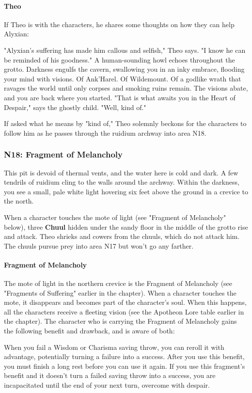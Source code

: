 \documentclass[10pt,a4,twoside,twocolumn,openany,nodeprecatedcode]{dndbook}
\begin{document}
\paragraph{Theo}
If Theo is with the characters, he shares some thoughts on how they can help Alyxian:
\begin{DndReadAloud}{}
"Alyxian's suffering has made him callous and selfish," Theo says. "I know he can be reminded of his goodness."
A human-sounding howl echoes throughout the grotto. Darkness engulfs the cavern, swallowing you in an inky embrace, flooding your mind with visions. Of Ank'Harel. Of Wildemount. Of a godlike wrath that ravages the world until only corpses and smoking ruins remain. The visions abate, and you are back where you started. "That is what awaits you in the Heart of Despair," says the ghostly child. "Well, kind of."
\end{DndReadAloud}

If asked what he means by "kind of," Theo solemnly beckons for the characters to follow him as he passes through the ruidium archway into area N18.
\subsubsection{N18: Fragment of Melancholy}
\begin{DndReadAloud}{}
This pit is devoid of thermal vents, and the water here is cold and dark. A few tendrils of ruidium cling to the walls around the archway. Within the darkness, you see a small, pale white light hovering six feet above the ground in a crevice to the north.
\end{DndReadAloud}

When a character touches the mote of light (see "Fragment of Melancholy" below), three \textbf{Chuul} hidden under the sandy floor in the middle of the grotto rise and attack. Theo shrieks and cowers from the chuuls, which do not attack him. The chuuls pursue prey into area N17 but won't go any farther.
\paragraph{Fragment of Melancholy}
The mote of light in the northern crevice is the Fragment of Melancholy (see "Fragments of Suffering" earlier in the chapter). When a character touches the mote, it disappears and becomes part of the character's soul. When this happens, all the characters receive a fleeting vision (see the Apotheon Lore table earlier in the chapter).
The character who is carrying the Fragment of Melancholy gains the following benefit and drawback, and is aware of both:
\begin{DndComment}{}
{{When you fail a Wisdom or Charisma saving throw, you can reroll it with advantage, potentially turning a failure into a success. After you use this benefit, you must finish a long rest before you can use it again.}}
{{If you use this fragment's benefit and it doesn't turn a failed saving throw into a success, you are incapacitated until the end of your next turn, overcome with despair.}}
\end{DndComment}
\end{document}
